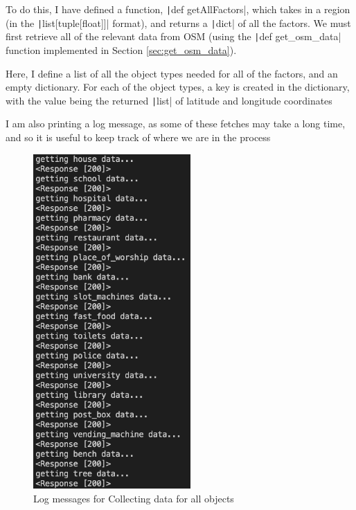 \documentclass[12pt]{report}
\newcommand{\pil}[1]{\protect\texttt|#1|}
\begin{document}
To do this, I have defined a function, \pil{def getAllFactors}, which takes in a region (in the \pil{list[tuple[float]]} format), and returns a \pil{dict} of all the factors. We must first retrieve all of the relevant data from OSM (using the \pil{def get_osm_data} function implemented in Section \ref{sec:get_osm_data}).

Here, I define a list of all the object types needed for all of the factors, and an empty dictionary. For each of the object types, a key is created in the dictionary, with the value being the returned \pil{list} of latitude and longitude coordinates

I am also printing a log message, as some of these fetches may take a long time, and so it is useful to keep track of where we are in the process

\begin{center}
\end{center}

\begin{figure}[H]
\centering
\includegraphics[width=6cm]{ss5.1.png}
\caption{Log messages for Collecting data for all objects}\label{fig:ss5.1}
\end{figure}
\end{document}
